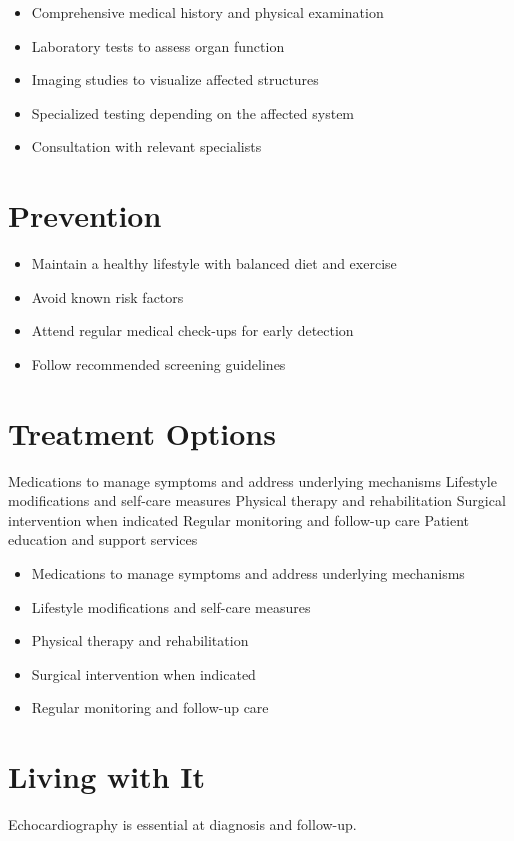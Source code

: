 \begin{itemize}[noitemsep]
  \item Comprehensive medical history and physical examination
  \item Laboratory tests to assess organ function
  \item Imaging studies to visualize affected structures
  \item Specialized testing depending on the affected system
  \item Consultation with relevant specialists
\end{itemize}
\section{Prevention}
\begin{itemize}[noitemsep]
  \item Maintain a healthy lifestyle with balanced diet and exercise
  \item Avoid known risk factors
  \item Attend regular medical check-ups for early detection
  \item Follow recommended screening guidelines
\end{itemize}
\section{Treatment Options}
Medications to manage symptoms and address underlying mechanisms Lifestyle modifications and self-care measures Physical therapy and rehabilitation Surgical intervention when indicated Regular monitoring and follow-up care Patient education and support services

\begin{itemize}[noitemsep]
  \item Medications to manage symptoms and address underlying mechanisms
  \item Lifestyle modifications and self-care measures
  \item Physical therapy and rehabilitation
  \item Surgical intervention when indicated
  \item Regular monitoring and follow-up care
\end{itemize}
\section{Living with It}
Echocardiography is essential at diagnosis and follow-up.

